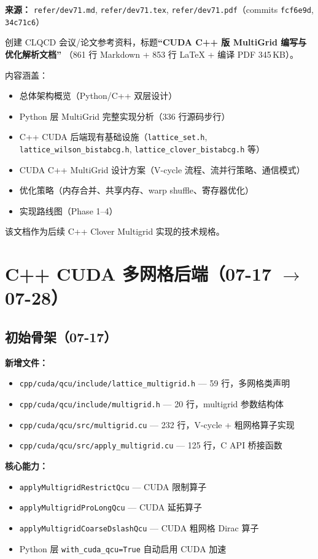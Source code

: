 \documentclass[11pt,a4paper]{article}
\begin{document}
\textbf{来源：} \texttt{refer/dev71.md}, \texttt{refer/dev71.tex}, \texttt{refer/dev71.pdf}（commits \texttt{fcf6e9d}, \texttt{34c71c6}）

创建 CLQCD 会议/论文参考资料，标题\textbf{``CUDA C++ 版 MultiGrid 编写与优化解析文档''}
（861 行 Markdown + 853 行 \LaTeX{} + 编译 PDF 345\,KB）。

内容涵盖：
\begin{itemize}
    \item 总体架构概览（Python/C++ 双层设计）
    \item Python 层 MultiGrid 完整实现分析（336 行源码步行）
    \item C++ CUDA 后端现有基础设施（\texttt{lattice\_set.h}, \texttt{lattice\_wilson\_bistabcg.h}, \texttt{lattice\_clover\_bistabcg.h} 等）
    \item CUDA C++ MultiGrid 设计方案（V-cycle 流程、流并行策略、通信模式）
    \item 优化策略（内存合并、共享内存、warp shuffle、寄存器优化）
    \item 实现路线图（Phase 1--4）
\end{itemize}

该文档作为后续 C++ Clover Multigrid 实现的技术规格。

\section{C++ CUDA 多网格后端（07-17 $\rightarrow$ 07-28）}

\subsection{初始骨架（07-17）}

\textbf{新增文件：}
\begin{itemize}
    \item \texttt{cpp/cuda/qcu/include/lattice\_multigrid.h} — 59 行，多网格类声明
    \item \texttt{cpp/cuda/qcu/include/multigrid.h} — 20 行，multigrid 参数结构体
    \item \texttt{cpp/cuda/qcu/src/multigrid.cu} — 232 行，V-cycle + 粗网格算子实现
    \item \texttt{cpp/cuda/qcu/src/apply\_multigrid.cu} — 125 行，C API 桥接函数
\end{itemize}

\textbf{核心能力：}
\begin{itemize}
    \item \texttt{applyMultigridRestrictQcu} — CUDA 限制算子
    \item \texttt{applyMultigridProLongQcu} — CUDA 延拓算子
    \item \texttt{applyMultigridCoarseDslashQcu} — CUDA 粗网格 Dirac 算子
    \item Python 层 \texttt{with\_cuda\_qcu=True} 自动启用 CUDA 加速
\end{itemize}
\end{document}

